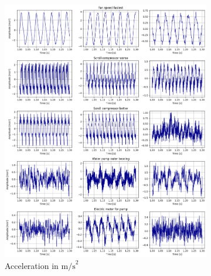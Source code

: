 \begin{figure}[h]
    \centering
    \begin{subfigure}[b]{0.49\textwidth}
        \includegraphics[width=\textwidth]{assets/design/EDA-custom-dataset-temporal.png}
        \caption{Acceleration in $\mathrm{m/s}^2$}
        \label{fig:design:preliminary-acceleration}
    \end{subfigure}
    \hfill
    \begin{subfigure}[b]{0.49\textwidth}

\end{subfigure}
\end{figure}
